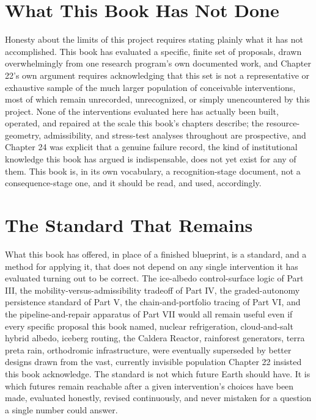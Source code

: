 \documentclass[11pt,oneside]{book}
\begin{document}
\section*{What This Book Has Not Done}

Honesty about the limits of this project requires stating plainly what it has not accomplished. This book has evaluated a specific, finite set of proposals, drawn overwhelmingly from one research program's own documented work, and Chapter 22's own argument requires acknowledging that this set is not a representative or exhaustive sample of the much larger population of conceivable interventions, most of which remain unrecorded, unrecognized, or simply unencountered by this project. None of the interventions evaluated here has actually been built, operated, and repaired at the scale this book's chapters describe; the resource-geometry, admissibility, and stress-test analyses throughout are prospective, and Chapter 24 was explicit that a genuine failure record, the kind of institutional knowledge this book has argued is indispensable, does not yet exist for any of them. This book is, in its own vocabulary, a recognition-stage document, not a consequence-stage one, and it should be read, and used, accordingly.

\section*{The Standard That Remains}

What this book has offered, in place of a finished blueprint, is a standard, and a method for applying it, that does not depend on any single intervention it has evaluated turning out to be correct. The ice-albedo control-surface logic of Part III, the mobility-versus-admissibility tradeoff of Part IV, the graded-autonomy persistence standard of Part V, the chain-and-portfolio tracing of Part VI, and the pipeline-and-repair apparatus of Part VII would all remain useful even if every specific proposal this book named, nuclear refrigeration, cloud-and-salt hybrid albedo, iceberg routing, the Caldera Reactor, rainforest generators, terra preta rain, orthodromic infrastructure, were eventually superseded by better designs drawn from the vast, currently invisible population Chapter 22 insisted this book acknowledge. The standard is not which future Earth should have. It is which futures remain reachable after a given intervention's choices have been made, evaluated honestly, revised continuously, and never mistaken for a question a single number could answer.
\end{document}
